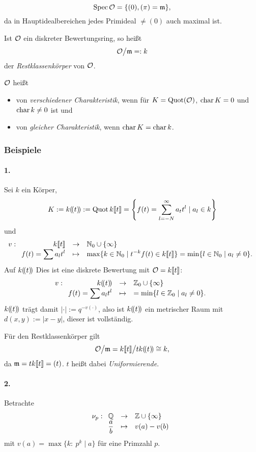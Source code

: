 \begin{bemerkung}
	\[\operatorname{Spec} \mathcal{O} = \{(0), (\pi) = \mathfrak{m} \},\]
	da in Hauptidealbereichen jedes Primideal $\neq (0)$ auch maximal ist.
\end{bemerkung}

\begin{definition}
	Ist $\mathcal{O}$ ein diskreter Bewertungsring, so heißt 
	\[ \mathcal{O}\big/ \mathfrak{m} =: k\]
	der \emph{Restklassenkörper} von $\mathcal{O}$.
	
	$\mathcal{O}$ heißt 
  \begin{itemize}
    \item von \emph{verschiedener Charakteristik}, wenn
      für $K = \operatorname{Quot}(\mathcal{O})$, $\operatorname{char} K = 0$ und $\operatorname{char} k \neq 0$ ist und
    \item von \emph{gleicher Charakteristik}, wenn $\operatorname{char} K = \operatorname{char} k$.
  \end{itemize}
\end{definition}

\subsubsection{Beispiele}

\paragraph{1.} Sei $k$ ein Körper, 
\[K := k (\!( t )\!) := \operatorname{Quot} k \llbracket t\rrbracket = \left\{f(t) = \sum_{l=-N}^\infty a_t t^l \mid 
	a_l \in k \right\}\]
und
\[
	v: \funcdef{ k\dk t &\to& \N_0 \cup\{\infty\} \\
		f(t) = \sum a_l t^l  & \mapsto & 
			\max\{ k\in \N_0 \mid t^{-k} f(t) \in k\dk t\}
			= \min\{ l\in \N_0 \mid a_l \neq 0 \}.}
\]
Auf $k(\!( t )\!)$ Dies ist eine diskrete Bewertung mit $\mathcal{O} = k\llbracket t\rrbracket$:
\[
	v: \funcdef{ k\dr t &\to& \Z_0 \cup\{\infty\} \\
		f(t) = \sum a_l t^l  & \mapsto & 
			= \min\{ l\in \Z_0 \mid a_l \neq 0 \}.}
\]
$k(\!( t )\!)$ trägt damit $|\cdot | := q^{-v(\cdot)}$, also ist $k(\!( t )\!)$ ein
metrischer Raum mit $d(x,y) := |x-y|$, dieser ist vollständig.

Für den Restklassenkörper gilt
\[ \mathcal{O} \big/ \mathfrak{m} = k\llbracket t\rrbracket \big/ t k (\!( t )\!) \cong k, \]
da $\mathfrak{m} = t k\llbracket t\rrbracket = (t)$. $t$ heißt dabei \emph{Uniformierende}.


\paragraph{2.}
Betrachte
\[ \nu_p: \funcdef{ \Q & \to & \Z \cup \{\infty\}\\
	\frac a b & \mapsto & v(a) - v(b)}
\]
mit $v(a) = \max\{ k:\ p^k \mid a \}$ für eine Primzahl $p$. 

